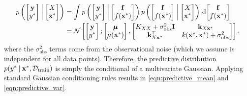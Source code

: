 \begin{align*}
  p \left(
    \begin{bmatrix} \by \\ \ytest \end{bmatrix} \: \middle| \:
    \begin{bmatrix} \bX \\ \bxtest \end{bmatrix}
  \right)
  &= \int
    p \left(
      \begin{bmatrix} \by \\ \ytest \end{bmatrix} \: \middle| \:
      \begin{bmatrix} \bfn \\ f(\bxtest) \end{bmatrix}
    \right)
    p \left(
      \begin{bmatrix} \bfn \\ f(\bxtest) \end{bmatrix} \: \middle| \:
      \begin{bmatrix} \bX \\ \bxtest \end{bmatrix}
    \right)
    \intd { \begin{bmatrix} \bfn \\ f(\bxtest) \end{bmatrix} }
  \\
  \vspace{0.5em}
  &= \normaldist{
    \begin{bmatrix} \by \\ \ytest \end{bmatrix} ;
    \begin{bmatrix} \bmu \\ \mu(\bxtest) \end{bmatrix}
  }{
    \begin{bmatrix}
      \bK_{\bX \bX} + \sigma_\text{obs}^2 \mathbf I   & \bk_{\bX \bxtest} \\
      \bk_{\bX \bxtest}^\top         & k(\bxtest, \bxtest) + \sigma_\text{obs}^2
    \end{bmatrix}
  }.
\end{align*}
where the $\sigma_\text{obs}^2$ terms come from the observational noise (which we assume is independent for all data points).
%
Therefore, the predictive distribution $p(y^* \: \vert \: \mathbf{x}^*, \mathcal D_\text{train})$ is simply the conditional of a multivariate Gaussian.
Applying standard Gaussian conditioning rules \citep[see e.g.][]{bishop2006pattern,rasmussen2006gaussian} results in \cref{eqn:predictive_mean} and \cref{eqn:predictive_var}.

